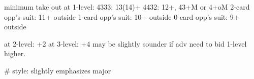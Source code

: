 minimum take out at 1-level: 
4333: 13(14)+
4432: 12+, 43+M or 4+oM
2-card opp's suit: 11+ outside
1-card opp's suit: 10+ outside
0-card opp's suit: 9+ outside

at 2-level: +2
at 3-level: +4
may be slightly sounder if adv need to bid 1-level higher.

# style: slightly emphasizes major